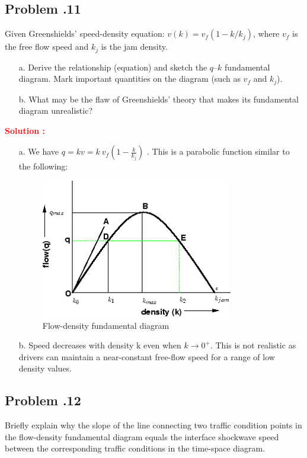 \documentclass[12pt]{article}
\newcommand{\customsubsection}[1]{
  \subsection*{Problem \thesection.#1}
}
\begin{document}
\customsubsection{11}
Given Greenshields’ speed-density equation: $v(k) = v_f(1 - k/k_j)$, where $v_f$ is the free flow speed and $k_j$ is the jam density.
    \begin{enumerate}
        \item[a.] Derive the relationship (equation) and sketch the $q – k$ fundamental diagram. Mark important quantities on the diagram (such as $v_f$ and $k_j$).
        \item[b.] What may be the flaw of Greenshields’ theory that makes its fundamental diagram unrealistic?
    \end{enumerate}
\textbf{\textcolor{red}{Solution :}} 
\begin{itemize}
    \item [a.] We have \( q = k v =  k\ v_f(1-\frac{k}{k_j}) \) . This is a parabolic function similar to the following:

    \begin{figure}[h!]
        \centering
        \includegraphics[width=0.5\linewidth]{img/P6_4.png}
        \caption{Flow-density fundamental diagram}
        \label{fig:P6_4}
    \end{figure}
    \item[b.] Speed decreases with density k even when $k \rightarrow 0^+$. This is not realistic as drivers can maintain a near-constant free-flow speed for a range of low density values. 
\end{itemize}

\newpage


\customsubsection{12}
Briefly explain why the slope of the line connecting two traffic condition points in the flow-density fundamental diagram equals the interface shockwave speed between the corresponding traffic conditions in the time-space diagram.\\ 
\end{document}
